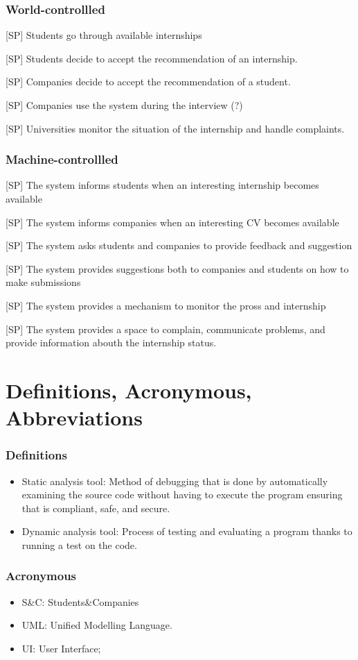\subsubsection{World-controllled}
[SP] Students go through available internships

[SP] Students decide to accept the recommendation of an internship.

[SP] Companies decide to accept the recommendation of a student. 

[SP] Companies use the system during the interview (?)

[SP] Universities monitor the situation of the internship and handle complaints.

\subsubsection{Machine-controllled}
[SP] The system informs students when an interesting internship becomes available

[SP] The system informs companies when an interesting CV becomes available

[SP] The system asks students and companies to provide feedback and suggestion

[SP] The system provides suggestions both to companies and students on how to make submissions

[SP] The system provides a mechanism to monitor the pross and internship

[SP] The system provides a space to complain, communicate problems, and provide information abouth the internship status.
\section{Definitions, Acronymous, Abbreviations}
\subsubsection{Definitions}
\begin{itemize}
    \item Static analysis tool: Method of debugging that is done by automatically examining the source code without having to execute the program ensuring that is compliant, safe, and secure.
    \item Dynamic analysis tool: Process of testing and evaluating a program thanks to running a test on the code.
\end{itemize}

\subsubsection{Acronymous}
\begin{itemize}
    \item S\&C: Students\&Companies
    \item UML: Unified Modelling Language.
    \item UI: User Interface;
\end{itemize}

